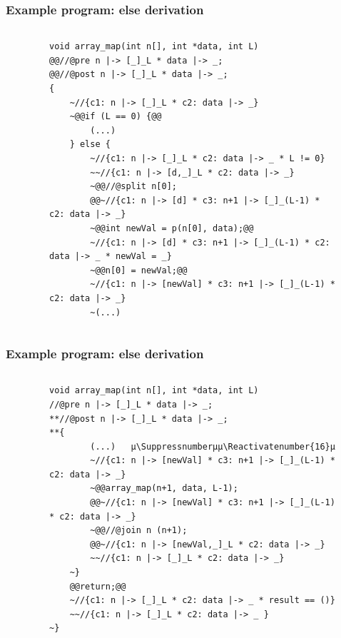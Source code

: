 \documentclass{beamer}
\makeatletter
\let\origthelstnumber\thelstnumber
\newcommand*\Suppressnumber{%
  \lst@AddToHook{OnNewLine}{%
    \let\thelstnumber\relax%
     \advance\c@lstnumber-\@ne\relax%
    }%
}
\newcommand*\Reactivatenumber[1]{%
  \setcounter{lstnumber}{\numexpr#1-1\relax}
  \lst@AddToHook{OnNewLine}{%
   \let\thelstnumber\origthelstnumber%
   \refstepcounter{lstnumber}
  }%
}
\makeatother
\begin{document}
\begin{frame}[fragile]
\frametitle{Example program: else derivation}
\vspace{-2em}
\begin{columns}
\begin{column}{0.03\textwidth}
\end{column}
\begin{column}{0.97\textwidth}
\begin{figure}[h]
  \centering
\begin{lstlisting}[style=CStyleOverlay, captionpos = t]
void array_map(int n[], int *data, int L)
@@//@pre n |-> [_]_L * data |-> _;
@@//@post n |-> [_]_L * data |-> _;
{
	~//{c1: n |-> [_]_L * c2: data |-> _}
	~@@if (L == 0) {@@
		(...)
	} else {
		~//{c1: n |-> [_]_L * c2: data |-> _ * L != 0}
		~~//{c1: n |-> [d,_]_L * c2: data |-> _}
		~@@//@split n[0];
		@@~//{c1: n |-> [d] * c3: n+1 |-> [_]_(L-1) * c2: data |-> _}
		~@@int newVal = p(n[0], data);@@
		~//{c1: n |-> [d] * c3: n+1 |-> [_]_(L-1) * c2: data |-> _ * newVal = _}
		~@@n[0] = newVal;@@
		~//{c1: n |-> [newVal] * c3: n+1 |-> [_]_(L-1) * c2: data |-> _}
		~(...)		
\end{lstlisting}
\end{figure}
\end{column}
\end{columns}
\end{frame}
\begin{frame}[fragile]
\frametitle{Example program: else derivation}
\vspace{-2em}
\begin{columns}
\begin{column}{0.03\textwidth}
\end{column}
\begin{column}{0.97\textwidth}
\begin{figure}[h]
  \centering
\begin{lstlisting}[style=CStyleOverlay, captionpos = t]
void array_map(int n[], int *data, int L)
//@pre n |-> [_]_L * data |-> _;
**//@post n |-> [_]_L * data |-> _;
**{
		(...)	µ\Suppressnumberµµ\Reactivatenumber{16}µ
		~//{c1: n |-> [newVal] * c3: n+1 |-> [_]_(L-1) * c2: data |-> _}
		~@@array_map(n+1, data, L-1);
		@@~//{c1: n |-> [newVal] * c3: n+1 |-> [_]_(L-1) * c2: data |-> _}
		~@@//@join n (n+1);
		@@~//{c1: n |-> [newVal,_]_L * c2: data |-> _}
		~~//{c1: n |-> [_]_L * c2: data |-> _}
	~}
	@@return;@@
	~//{c1: n |-> [_]_L * c2: data |-> _ * result == ()}
	~~//{c1: n |-> [_]_L * c2: data |-> _ }
~}
\end{lstlisting}
\end{figure}
\end{column}
\end{columns}
\end{frame}
\end{document}
